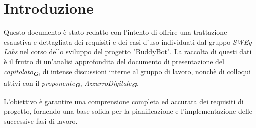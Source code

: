 

\section{Introduzione}
\label{sec:introduzione}

Questo documento è stato redatto con l'intento di offrire una trattazione esaustiva e dettagliata 
dei requisiti e dei casi d'uso individuati dal gruppo \emph{SWEg Labs} nel corso dello sviluppo
del progetto "BuddyBot". La raccolta di questi dati è il frutto di un'analisi approfondita
del documento di presentazione del \emph{capitolato}\textsubscript{\textit{\textbf{G}}}, di intense discussioni interne al gruppo di lavoro, 
nonchè di colloqui attivi con il \emph{proponente}\textsubscript{\textit{\textbf{G}}}, \emph{AzzurroDigitale}\textsubscript{\textit{\textbf{G}}}.

L'obiettivo è garantire una comprensione completa ed accurata dei requisiti di progetto,
fornendo una base solida per la pianificazione e l'implementazione delle successive fasi di lavoro.

